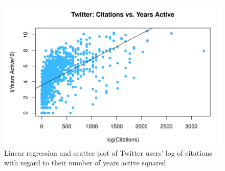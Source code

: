 \documentclass[12pt, Times New Roman]{article}
\begin{document}
\begin{figure}[h]
    \includegraphics[width=.75\textwidth]{Scatter-YearsActive.png}
    \centering
    \caption{Linear regression and scatter plot of Twitter users' log of citations with regard to their number of years active squared}
    \label{Scat2}
\end{figure}
\end{document}
